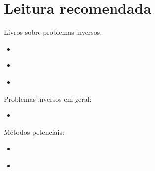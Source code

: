\chapter{Leitura recomendada}

\noindent 
Livros sobre problemas inversos:

\begin{itemize}
\item \cite{tarantola}
\item \cite{menke}
\item \cite{aster}
\end{itemize}

\noindent
Problemas inversos em geral:

\begin{itemize}
\item \cite{medeiros&silva1996}
\end{itemize}

\noindent
Métodos potenciais:

\begin{itemize}
\item \cite{silva_etal2001}
\item \cite{martins_etal2011}
\end{itemize}
